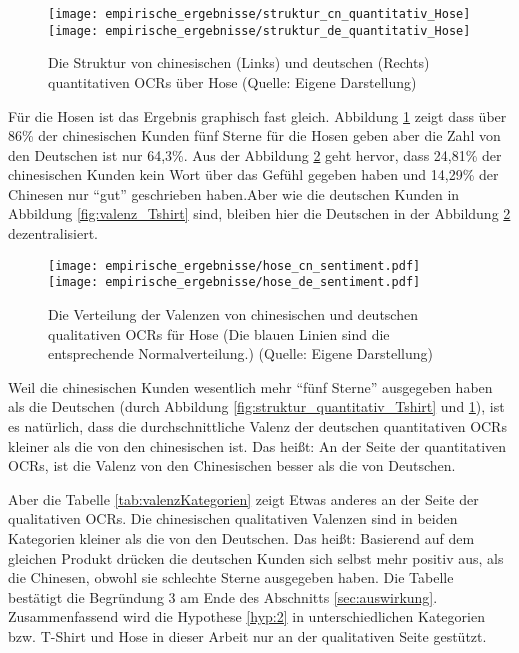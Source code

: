\begin{figure}[htb]
    {\texttt{[image: empirische\_ergebnisse/struktur\_cn\_quantitativ\_Hose]}}    
    {\texttt{[image: empirische\_ergebnisse/struktur\_de\_quantitativ\_Hose]}}   
    \caption[Die Struktur von chinesischen und deutschen quantitativen OCRs über Hose]{Die Struktur von chinesischen (Links) und deutschen (Rechts) quantitativen \ac{OCRs} über Hose (Quelle: Eigene Darstellung)}
    \label{fig:struktur_quantitativ_Hose}
\end{figure}

Für die Hosen ist das Ergebnis graphisch fast gleich. Abbildung \ref{fig:struktur_quantitativ_Hose} zeigt dass über 86\% der chinesischen Kunden fünf Sterne für die Hosen geben aber die Zahl von den Deutschen ist nur 64,3\%. Aus der Abbildung \ref{fig:valenz_Hose} geht hervor, dass 24,81\% der chinesischen Kunden kein Wort über das Gefühl gegeben haben und 14,29\% der Chinesen nur ``gut'' geschrieben haben.Aber wie die deutschen Kunden in Abbildung \ref{fig:valenz_Tshirt} sind, bleiben hier die Deutschen in der Abbildung \ref{fig:valenz_Hose} dezentralisiert.
\begin{figure}[htb]
    \texttt{[image: empirische\_ergebnisse/hose\_cn\_sentiment.pdf]}
    \endminipage\hfill
    \texttt{[image: empirische\_ergebnisse/hose\_de\_sentiment.pdf]}
    \endminipage 
    \caption[Die Verteilung der Valenzen von chinesischen und deutschen qualitativen OCRs für Hose]{Die Verteilung der Valenzen von chinesischen und deutschen qualitativen \ac{OCRs} für Hose (Die blauen Linien sind die entsprechende Normalverteilung.) (Quelle: Eigene Darstellung)}
    \label{fig:valenz_Hose}
\end{figure}

Weil die chinesischen Kunden wesentlich mehr ``fünf Sterne'' ausgegeben haben als die Deutschen (durch Abbildung \ref{fig:struktur_quantitativ_Tshirt} und \ref{fig:struktur_quantitativ_Hose}), ist es natürlich, dass die durchschnittliche Valenz der deutschen quantitativen \ac{OCRs} kleiner als die von den chinesischen ist. Das heißt: An der Seite der quantitativen \ac{OCRs}, ist die Valenz von den Chinesischen besser als die von Deutschen.

Aber die Tabelle \ref{tab:valenzKategorien} zeigt Etwas anderes an der Seite der qualitativen \ac{OCRs}. Die chinesischen qualitativen Valenzen sind in beiden Kategorien kleiner als die von den Deutschen. Das heißt: Basierend auf dem gleichen Produkt drücken die deutschen Kunden sich selbst mehr positiv aus, als die Chinesen, obwohl sie schlechte Sterne ausgegeben haben. Die Tabelle bestätigt die Begründung 3 am Ende des Abschnitts \ref{sec:auswirkung}. Zusammenfassend wird die Hypothese \ref{hyp:2} in unterschiedlichen Kategorien \ac{bzw.} T-Shirt und Hose in dieser Arbeit nur an der qualitativen Seite gestützt.


